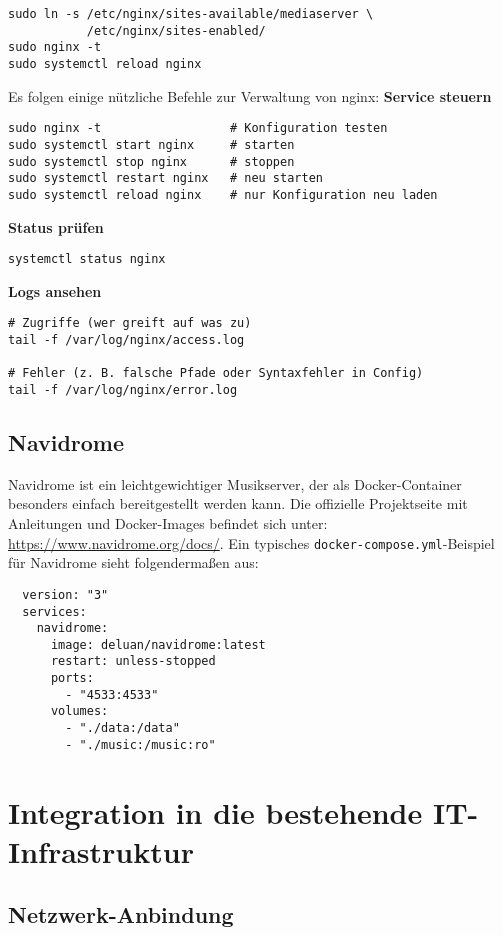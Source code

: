 \documentclass[12pt,a4paper]{report}
\begin{document}
  \begin{verbatim}
sudo ln -s /etc/nginx/sites-available/mediaserver \
           /etc/nginx/sites-enabled/
sudo nginx -t
sudo systemctl reload nginx
  \end{verbatim}  

  Es folgen einige nützliche Befehle zur Verwaltung von nginx:
  \textbf{Service steuern}  
  \begin{verbatim}
sudo nginx -t                  # Konfiguration testen
sudo systemctl start nginx     # starten
sudo systemctl stop nginx      # stoppen
sudo systemctl restart nginx   # neu starten
sudo systemctl reload nginx    # nur Konfiguration neu laden
  \end{verbatim}

  \textbf{Status prüfen}  
  \begin{verbatim}
systemctl status nginx
  \end{verbatim}

  \textbf{Logs ansehen}  
  \begin{verbatim}
# Zugriffe (wer greift auf was zu)
tail -f /var/log/nginx/access.log

# Fehler (z. B. falsche Pfade oder Syntaxfehler in Config)
tail -f /var/log/nginx/error.log
  \end{verbatim}
 
  \subsection{Navidrome}  
  Navidrome ist ein leichtgewichtiger Musikserver, der als Docker-Container besonders einfach bereitgestellt werden kann.  
  Die offizielle Projektseite mit Anleitungen und Docker-Images befindet sich unter: \url{https://www.navidrome.org/docs/}.  
  Ein typisches \texttt{docker-compose.yml}-Beispiel für Navidrome sieht folgendermaßen aus:  
  \begin{verbatim}
  version: "3"
  services:
    navidrome:
      image: deluan/navidrome:latest
      restart: unless-stopped
      ports:
        - "4533:4533"
      volumes:
        - "./data:/data"
        - "./music:/music:ro"
  \end{verbatim}   

\section{Integration in die bestehende IT-Infrastruktur}
  \subsection{Netzwerk-Anbindung}  
\end{document}
